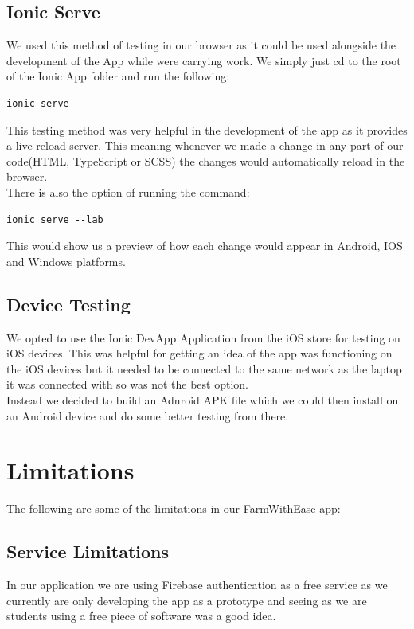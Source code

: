 \documentclass[12pt,a4paper,oneside,openany]{book}
\begin{document}
\subsection{Ionic Serve}
We used this method of testing in our browser as it could be used alongside the development of the App while were carrying work. We simply just cd to the root of the Ionic App folder and run the following:
\begin{verbatim}
ionic serve
\end{verbatim}

This testing method was very helpful in the development of the app as it provides a live-reload server. This meaning whenever we made a change in any part of our code(HTML, TypeScript or SCSS) the changes would automatically reload in the browser.
\\
There is also the option of running the command:
\begin{verbatim}
ionic serve --lab
\end{verbatim}

This would show us a preview of how each change would appear in Android, IOS and Windows platforms.

\subsection{Device Testing}
We opted to use the Ionic DevApp Application from the iOS store for testing on iOS devices. This was helpful for getting an idea of the app was functioning on the iOS devices but it needed to be connected to the same network as the laptop it was connected with so was not the best option.\\

\noindent
Instead we decided to build an Adnroid APK file which we could then install on an Android device and do some better testing from there.

\section{Limitations}
The following are some of the limitations in our FarmWithEase app:

\subsection{Service Limitations}
In our application we are using Firebase authentication as a free service as we currently are only developing the app as a prototype and seeing as we are students using a free piece of software was a good idea. 
\end{document}
